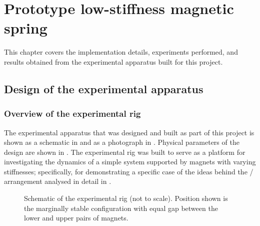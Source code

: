 
\chapter{Prototype low-stiffness magnetic spring}


This chapter covers the implementation details, experiments performed,
and results obtained from the experimental apparatus built for this
project.

\section{Design of the experimental apparatus}

\subsection{Overview of the experimental rig}

The experimental apparatus that was designed and built as part of this project
is shown as a schematic in  and as a photograph in
. Physical parameters of the design are shown in
. The experimental rig was built to serve as a platform for
investigating the dynamics of a simple system supported by magnets with
varying stiffnesses; specifically, for demonstrating a specific case of
the ideas behind the \qzs/ arrangement analysed in detail in .

\begin{figure}
  \begin{wide}
  \end{wide}
  \caption{
    Schematic of the experimental rig (not to scale). Position shown is
    the marginally stable configuration with equal gap between the lower
    and upper pairs of magnets.}
\end{figure}

